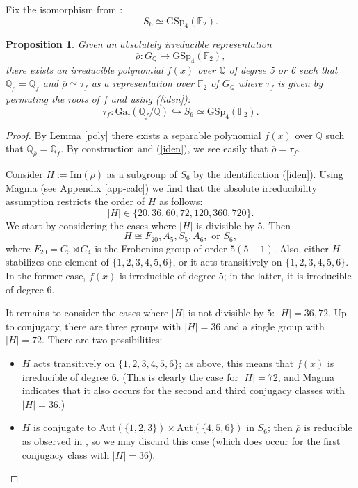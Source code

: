\documentclass{amsart}
\newtheorem{prop}[theorem]{Proposition}
\theoremstyle{definition}
\newcommand{\lra}{\longrightarrow}
\newcommand{\Q}{\mathbb{Q}}
\newcommand{\F}{\mathbb{F}}
\newcommand{\br}{\overline{\rho}}
\newcommand{\GSp}{\mathrm{GSp}}
\newcommand{\Gal}{\mathrm{Gal}}
\newcommand{\im}{\mathrm{Im}}
\newcommand{\Aut}{\mathrm{Aut}}
\begin{document}
Fix the isomorphism from \cite[Section 2]{GY}:
\begin{equation}\label{iden}
  S_6\simeq \GSp_4(\F_2).
\end{equation}
\begin{prop}\label{abs-case}
  Given an absolutely irreducible representation
  \begin{equation*}
    \br:G_\Q\lra \GSp_4(\F_2),
  \end{equation*}
  there exists an irreducible polynomial $f(x)$ over $\Q$ of degree 5 or 6 such that $\Q_{\br}=\Q_f$
  and $\br\simeq \tau_f$ as a representation over $\F_2$ of $G_\Q$ where $\tau_f$ is given by permuting the roots of $f$ and using (\ref{iden}):
  \begin{equation*}
    \tau_f:\Gal(\Q_{f}/\Q)\hookrightarrow S_6\simeq \GSp_4(\F_2).
  \end{equation*}
\end{prop}
\begin{proof}
  By Lemma \ref{poly} there exists a separable polynomial $f(x)$ over $\Q$ such that $\Q_{\br}=\Q_f$.
  By construction and (\ref{iden}), we see easily that $\br=\tau_f$.

  Consider $H:=\im(\br)$ as a subgroup of $S_6$ by the identification (\ref{iden}).
  Using Magma (see Appendix \ref{app-calc}) we find that the absolute irreducibility assumption restricts the order of $H$ as follows:
  \begin{equation*}
    |H|\in\{20, 36, 60, 72, 120, 360, 720\}.
  \end{equation*}
  We start by considering the cases where $|H|$ is divisible by $5$.
  Then
  \begin{equation*}
    H\cong F_{20}, A_5, S_5, A_6, \text{ or }S_6,
  \end{equation*}
  where $F_{20}=C_5\rtimes C_4$ is the Frobenius group of order $5(5-1)$.
  Also, either $H$ stabilizes one element of $\{1,2,3,4,5,6\}$, or it acts transitively on $\{1,2,3,4,5,6\}$.
  In the former case, $f(x)$ is irreducible of degree $5$; in the latter, it is irreducible of degree $6$.

  It remains to consider the cases where $|H|$ is not divisible by $5$: $|H|=36, 72$.
  Up to conjugacy, there are three groups with
  $|H|=36$ and a single group with $|H|=72$.
  There are two possibilities:
  \begin{itemize}
    \item $H$ acts transitively on $\{1,2,3,4,5,6\}$; as above, this means that $f(x)$ is irreducible of degree $6$.
      (This is clearly the case for $|H|=72$, and Magma indicates that it also occurs for the second and third conjugacy classes with $|H|=36$.)
    \item $H$ is conjugate to $\Aut(\{1,2,3\})\times \Aut(\{4,5,6\})$ in $S_6$; then $\br$ is reducible as observed in \cite[Section 3.1]{TY}, so we may discard this case (which does occur for the first conjugacy class with $|H|=36$).\qedhere
  \end{itemize}
\end{proof}
\end{document}
